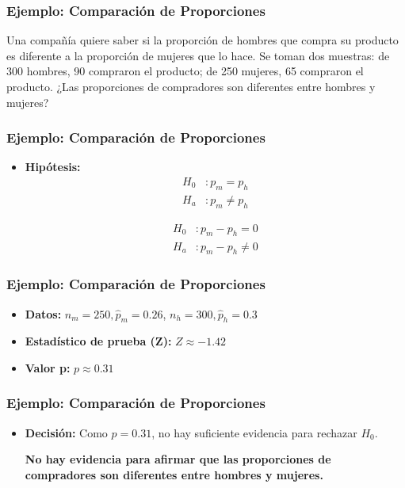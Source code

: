 \documentclass[aspectratio=169]{beamer}
\begin{document}
\begin{frame}
\frametitle{Ejemplo: Comparación de Proporciones}


Una compañía quiere saber si la proporción de hombres que compra su producto es diferente a la proporción de mujeres que lo hace. Se toman dos muestras: de 300 hombres, 90 compraron el producto; de 250 mujeres, 65 compraron el producto. ¿Las proporciones de compradores son diferentes entre hombres y mujeres?


\end{frame}


\begin{frame}
\frametitle{Ejemplo: Comparación de Proporciones}

\begin{itemize}
    \item \textbf{Hipótesis:}
    \begin{align*}
    H_0 &: p_m = p_h \\
    H_a &: p_m \neq p_h
    \end{align*}

    \vfill

    \begin{align*}
    H_0 &: p_m - p_h = 0 \\
    H_a &: p_m - p_h \neq 0
    \end{align*}

\end{itemize}

\end{frame}


\begin{frame}
\frametitle{Ejemplo: Comparación de Proporciones}

\begin{itemize}

    \item \textbf{Datos:} \( n_m = 250, \hat{p}_m = 0.26 \), \( n_h = 300, \hat{p}_h = 0.3 \)
    
    \item \textbf{Estadístico de prueba (Z):} 
    \( Z \approx -1.42 \)
    
    \item \textbf{Valor p:} \( p \approx 0.31 \)

\end{itemize}

\end{frame}


\begin{frame}
\frametitle{Ejemplo: Comparación de Proporciones}


    
\begin{itemize}


    \item \textbf{Decisión:} Como \( p = 0.31 \), no hay suficiente evidencia para rechazar \( H_0 \). 
    
    \vfill
    
    {\bf No hay evidencia para afirmar que las proporciones de compradores son diferentes entre hombres y mujeres.}
\end{itemize}
\end{frame}
\end{document}

